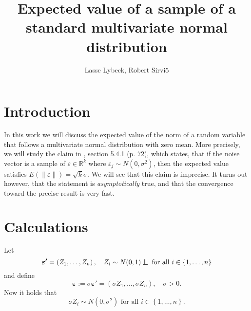 \documentclass[12pt,a4]{article}
\title{Expected value of a sample of a standard multivariate normal distribution}
\author{Lasse Lybeck, Robert Sirviö}
\newcommand{\R}{{\mathbb R}}
\newcommand{\lnorm}{\left\|}
\newcommand{\rnorm}{\right\|}
\newcommand{\eps}{\ensuremath{\varepsilon}}
\newcommand{\vc}[1]{\ensuremath{\bm{#1}}}
\newcommand*{\bigCI}{%
  \mathrel{\text{%
    {\rotatebox[origin=c]{90}{\resizebox{2.25ex}{1.65ex}{$\vDash$}}}%
  }}%
}
\begin{document}
\maketitle

\section{Introduction}

In this work we will discuss the expected value of the norm of a random variable that follows a multivariate normal distribution with zero mean. More precisely, we will study the claim in \cite{samu}, section 5.4.1 (p. 72), which states, that if the noise vector is a sample of $\eps \in \R^k$ where $\eps_j \sim N(0, \sigma^2)$, then the expected value satisfies $E \left( \lnorm \eps \rnorm \right) = \sqrt{k} \sigma$. We will see that this claim is imprecise. It turns out however, that the statement is \emph{asymptotically} true, and that the convergence toward the precise result is very fast.

\section{Calculations}
\label{sec:calc}

Let
\begin{equation}
\vc{\eps'} = \left(Z_1, \ldots, Z_n \right), \quad Z_i \sim N(0,1) \bigCI \text{ for all }
i \in \left\{1, \ldots, n\right\} 
\end{equation}
and define
\begin{equation}
\label{eq:epsdef}
\vc{\eps} := \sigma \vc{\eps'} = \left(\sigma Z_1, \ldots, \sigma Z_n \right), \quad \sigma > 0.
\end{equation}
Now it holds that
\begin{equation}
\sigma Z_i \sim N\left(0,\sigma^2\right) \text{ for all }
i \in \left\{1, \ldots, n\right\}.
\end{equation}
\end{document}
